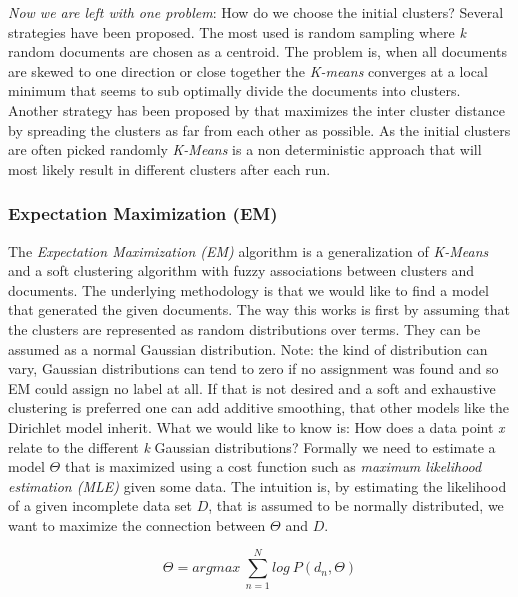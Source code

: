     \emph{Now we are left with one problem}: How do we choose the initial clusters? Several strategies have been proposed. The most used is random sampling where \emph{k} random documents are chosen as a centroid. The problem is, when all documents are skewed to one direction or close together the \emph{K-means} converges at a local minimum that seems to sub optimally divide the documents into clusters.
    Another strategy has been proposed by \cite{KMeansPlusPlus2007} that maximizes the inter cluster distance by spreading the clusters as far from each other as possible. 
    As the initial clusters are often picked randomly \emph{K-Means} is a non deterministic approach that will most likely result in different clusters after each run.

    \subsubsection{Expectation Maximization (EM)}
    \label{sec:em}

    The \emph{Expectation Maximization (EM)} algorithm is a generalization of \emph{K-Means} and a soft clustering algorithm with fuzzy associations between clusters and documents. The underlying methodology is that we would like to find a model that generated the given documents. The way this works is first by assuming that the clusters are represented as random distributions over terms. They can be assumed as a normal Gaussian distribution. Note: the kind of distribution can vary, Gaussian distributions can tend to zero if no assignment was found and so EM could assign no label at all. If that is not desired and a soft and exhaustive clustering is preferred one can add additive smoothing, that other models like the Dirichlet model inherit. What we would like to know is: How does a data point \emph{x} relate to the different \emph{k} Gaussian distributions? Formally we need to estimate a model $\Theta$ that is maximized using a cost function such as \emph{maximum likelihood estimation (MLE)} given some data. The intuition is, by estimating the likelihood of a given incomplete data set $D$, that is assumed to be normally distributed, we want to maximize the connection between $\Theta$ and $D$.

      \begin{equation}
        \Theta = argmax\:\sum_{n=1}^{N}log\:P(d_n,\Theta)
      \end{equation}

